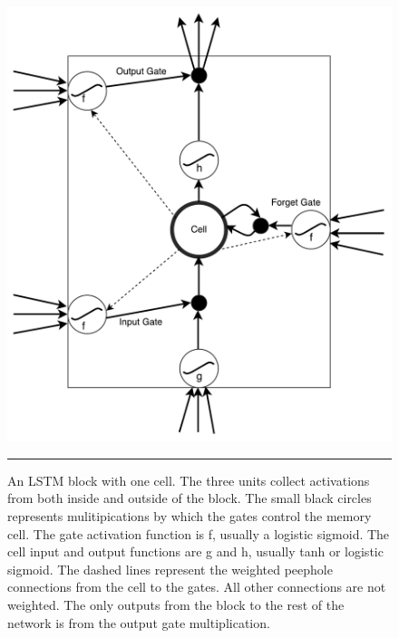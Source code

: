 \begin{figure}[htbp]
  \centering
    \includegraphics[width=\textwidth,height=\textheight,keepaspectratio]
    {Figures/lstm-block.pdf}
    \rule{35em}{0.5pt}
  \caption[An LSTM block with one cell]
{An LSTM block with one cell. The three units collect activations from both inside and outside of
the block. The small black circles represents mulitipications by which the gates control the
memory cell. The gate activation function is f, usually a logistic sigmoid. The cell input and
output functions are g and h, usually tanh or logistic sigmoid. The dashed lines represent the
weighted peephole connections from the cell to the gates. All other connections are not weighted.
The only outputs from the block to the rest of the network is from the output gate multiplication.}
  \label{fig:lstmBlock}
\end{figure}